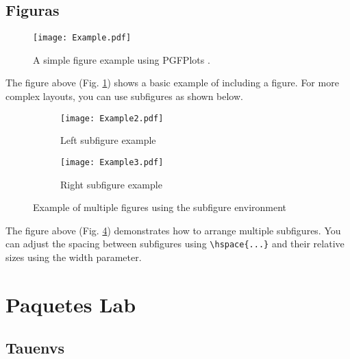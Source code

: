     \subsection*{Figuras}
        \begin{figure}[H]
            \centering
            \texttt{[image: Example.pdf]}
            \caption{A simple figure example using PGFPlots \cite{PGFPlots}.}
            \label{fig:figure}
        \end{figure}

        The figure above (Fig. \ref{fig:figure}) shows a basic example of including a figure. For more complex layouts, you can use subfigures as shown below.

        \begin{figure}[H]
            \centering
            \begin{subfigure}[b]{0.45\textwidth}
                \centering
                \texttt{[image: Example2.pdf]}
                \caption{Left subfigure example}
                \label{fig:figa}
            \end{subfigure}
            \hspace{0.05\textwidth}
            \begin{subfigure}[b]{0.45\textwidth}
                \centering
                \texttt{[image: Example3.pdf]}
                \caption{Right subfigure example}
                \label{fig:figb}
            \end{subfigure}
            \caption{Example of multiple figures using the subfigure environment}
            \label{fig:examplefloat}
        \end{figure}

        The figure above (Fig. \ref{fig:examplefloat}) demonstrates how to arrange multiple subfigures. You can adjust the spacing between subfigures using \verb|\hspace{...}| and their relative sizes using the width parameter.
		
\section*{Paquetes Lab}

    \subsection*{Tauenvs}
	
